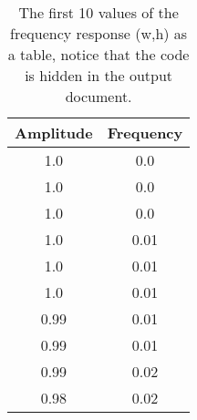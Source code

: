 \documentclass[a4paper,11pt,final]{article}
\begin{document}
\begin{table}
\caption{The first 10 values of the frequency response (w,h) as a table, notice that the code is hidden in the output document.}
\begin{center}
\begin{tabular}{ c | c }
\hline
\textbf{Amplitude} &  \textbf{Frequency} \\ \hline



1.0 & 0.0 \\
1.0 & 0.0 \\
1.0 & 0.0 \\
1.0 & 0.01 \\
1.0 & 0.01 \\
1.0 & 0.01 \\
0.99 & 0.01 \\
0.99 & 0.01 \\
0.99 & 0.02 \\
0.98 & 0.02 \\

\end{tabular}
\end{center}
\end{table}
\end{document}
